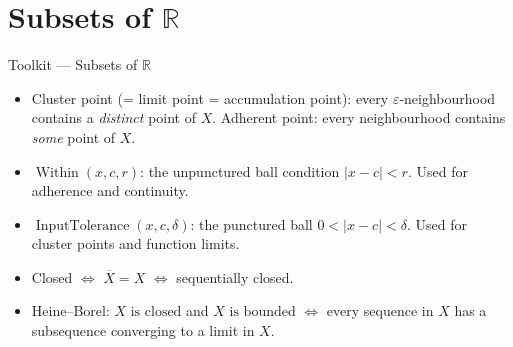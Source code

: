 \section{Subsets of $\mathbb{R}$}

\begin{toolkitbox}{Toolkit --- Subsets of $\mathbb{R}$}
\begin{itemize}
  \item Cluster point (= limit point = accumulation point): every
    $\varepsilon$-neighbourhood contains a \emph{distinct} point of $X$.
    Adherent point: every neighbourhood contains \emph{some} point of $X$.
  \item $\operatorname{Within}(x,c,r)$: the unpunctured ball condition
    $|x-c| < r$. Used for adherence and continuity.
  \item $\operatorname{InputTolerance}(x,c,\delta)$: the punctured ball
    $0 < |x-c| < \delta$. Used for cluster points and function limits.
  \item Closed $\iff$ $\overline{X} = X$ $\iff$ sequentially closed.
  \item Heine--Borel: $X\text{ is closed}$ and
    $X\text{ is bounded}$ $\iff$ every sequence in $X$ has a
    subsequence converging to a limit in $X$.
\end{itemize}
\end{toolkitbox}


